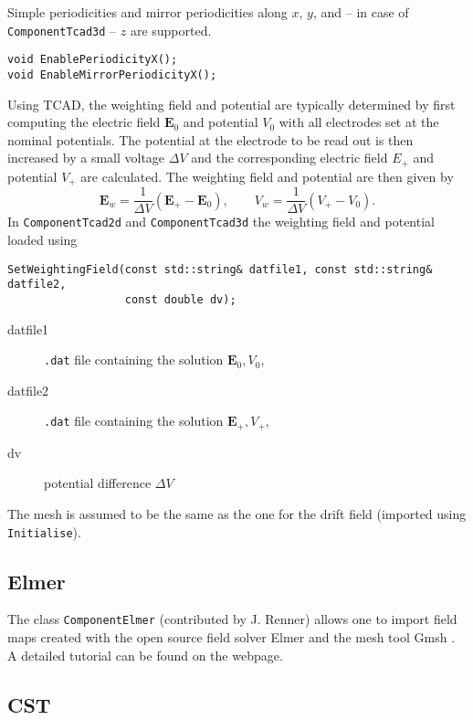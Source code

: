 Simple periodicities and mirror periodicities along 
\(x\), \(y\), and -- in case of \texttt{ComponentTcad3d} -- \(z\) 
are supported. 
\begin{lstlisting}
void EnablePeriodicityX();
void EnableMirrorPeriodicityX();
\end{lstlisting}

Using TCAD, the weighting field and potential are typically determined 
by first computing the electric field $\mathbf{E}_{0}$ and potential 
$V_{0}$ with all electrodes set at the nominal potentials.
The potential at the electrode to be read out is then increased by a 
small voltage $\Delta V$ and the corresponding electric field $E_{+}$ and 
potential $V_{+}$ are calculated. The weighting field and potential 
are then given by 
\begin{equation*}
  \mathbf{E}_{w} = \frac{1}{\Delta V}\left(\mathbf{E}_{+} - \mathbf{E}_{0}\right), \qquad V_{w} = \frac{1}{\Delta V}\left(V_{+} - V_{0}\right).
\end{equation*}
In \texttt{ComponentTcad2d} and \texttt{ComponentTcad3d} the weighting 
field and potential loaded using
\begin{lstlisting} 
SetWeightingField(const std::string& datfile1, const std::string& datfile2,
                  const double dv); 
\end{lstlisting}
\begin{description}
  \item[datfile1] \texttt{.dat} file containing the solution $\mathbf{E}_0, V_0$,
  \item[datfile2] \texttt{.dat} file containing the solution $\mathbf{E}_+, V_+$,
  \item[dv] potential difference $\Delta V$
\end{description}
The mesh is assumed to be the same as the one for the drift field 
(imported using \texttt{Initialise}).

\subsection{Elmer}

The class \texttt{ComponentElmer} (contributed by J. Renner) allows one to import 
field maps created with the open source field solver Elmer \cite{Elmer}
and the mesh tool Gmsh \cite{Gmsh}. 
A detailed tutorial can be found on the webpage. 

\subsection{CST}


